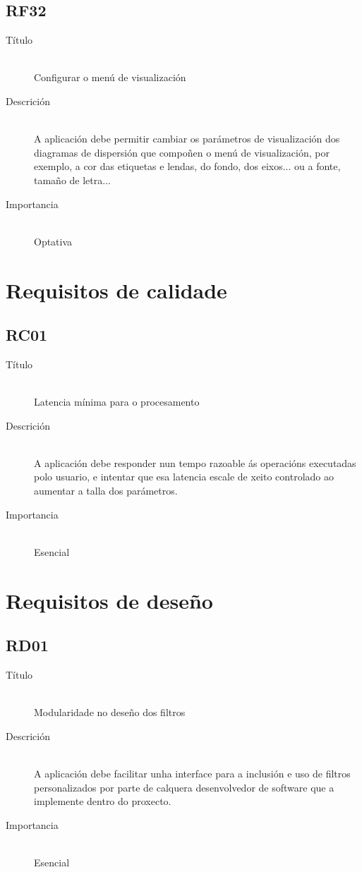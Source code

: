 \subsection*{RF32}
\begin{description}
\item[Título] \hfill \\
Configurar o menú de visualización
\item[Descrición] \hfill \\
A aplicación debe permitir cambiar os parámetros de visualización dos diagramas de dispersión que compoñen o menú de visualización, por exemplo, a cor das etiquetas e lendas, do fondo, dos eixos... ou a fonte, tamaño de letra...
\item[Importancia] \hfill \\
Optativa
\end{description}

\section{Requisitos de calidade}

\subsection*{RC01}
\begin{description}
\item[Título] \hfill \\
Latencia mínima para o procesamento
\item[Descrición] \hfill \\
A aplicación debe responder nun tempo razoable ás operacións executadas polo usuario, e intentar que esa latencia escale de xeito controlado ao aumentar a talla dos parámetros.
\item[Importancia] \hfill \\
Esencial
\end{description}

\section{Requisitos de deseño}

\subsection*{RD01}
\begin{description}
\item[Título] \hfill \\
Modularidade no deseño dos filtros
\item[Descrición] \hfill \\
A aplicación debe facilitar unha interface para a inclusión e uso de filtros personalizados por parte de calquera desenvolvedor de software que a implemente dentro do proxecto.
\item[Importancia] \hfill \\
Esencial
\end{description}


